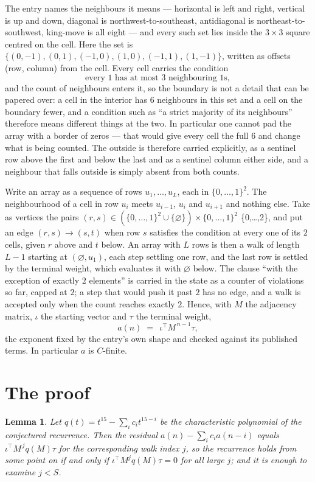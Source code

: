 \documentclass[11pt,a4paper]{article}
\theoremstyle{plain}
\newtheorem{lemma}[theorem]{Lemma}
\theoremstyle{definition}
\begin{document}
The entry names the neighbours it means --- horizontal is left and right, vertical is up and
down, diagonal is northwest-to-southeast, antidiagonal is northeast-to-southwest, king-move is
all eight --- and every such set lies inside the $3\times3$ square centred on the cell. Here
the set is $\{(0,-1), (0,1), (-1,0), (1,0), (-1,1), (1,-1)\}$, written as offsets (row, column) from the cell. Every cell carries
the condition
\[
\text{every 1 has at most 3 neighbouring 1s},
\]
and the count of neighbours enters it, so the boundary is not a detail that can be papered
over: a cell in the interior has $6$ neighbours in this set and a cell on the boundary
fewer, and a condition such as ``a strict majority of its neighbours'' therefore means
different things at the two. In particular one cannot pad the array with a border of zeros ---
that would give every cell the full $6$ and change what is being counted. The outside is
therefore carried
explicitly, as a sentinel row above the first and below the last and as a sentinel column
either side, and a neighbour that falls outside is simply absent from both counts.

Write an array as a sequence of rows $u_1,\dots,u_L$, each in
$\{0,\dots,1\}^{2}$. The neighbourhood of a cell in row $u_i$ meets $u_{i-1}$,
$u_i$ and $u_{i+1}$ and nothing else. Take as vertices the pairs
$(r,s)\in(\{0,\dots,1\}^{2}\cup\{\varnothing\})\times\{0,\dots,1\}^{2}$ \times \{0,\dots,2\},
and put an edge $(r,s)\to(s,t)$ when row $s$ satisfies the condition at every one of its
$2$ cells, given $r$ above and $t$ below. An array with $L$ rows is then a walk of length
$L-1$ starting at $(\varnothing,u_1)$, each step settling one row, and the last row is
settled by the terminal weight, which evaluates it with $\varnothing$ below. The clause ``with the exception of exactly $2$ elements'' is carried in
the state as a counter of violations so far, capped at $2$; a step that would push it past
$2$ has no edge, and a walk is accepted only when the count reaches exactly $2$. Hence,
with $M$ the adjacency matrix, $\iota$ the starting vector and $\tau$ the terminal weight,
\[
a(n)\;=\;\,\iota^{\!\top}M^{\,n-1}\tau ,
\]
the exponent fixed by the entry's own shape and checked against its published terms. In
particular $a$ is $C$-finite.

\section{The proof}

\begin{lemma}\label{lem:crit}
Let $q(t)=t^{15}-\sum_i c_it^{15-i}$ be the characteristic polynomial of the
conjectured recurrence. Then the residual $a(n)-\sum_ic_ia(n-i)$ equals
$\iota^{\!\top}M^{\,j}q(M)\tau$ for the corresponding walk index $j$, so the
recurrence holds from some point on if and only if $\iota^{\!\top}M^{j}q(M)\tau=0$ for all
large $j$; and it is enough to examine $j<S$.
\end{lemma}
\end{document}
